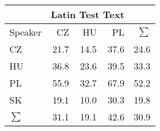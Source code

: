 \begin{tabular}{l|rrr|r}
\hline
 & \multicolumn{3}{c}{Latin Test Text} & \\
\hline
 Speaker   &   CZ &   HU &   PL &   $\sum$ \\
\hline
 CZ        & 21.7 & 14.5 & 37.6 &     24.6 \\
 HU        & 36.8 & 23.6 & 39.5 &     33.3 \\
 PL        & 55.9 & 32.7 & 67.9 &     52.2 \\
 SK        & 19.1 & 10.0 & 30.3 &     19.8 \\
\hline
 $\sum$   & 31.1 & 19.1 & 42.6 &     30.9 \\
\hline
\end{tabular}